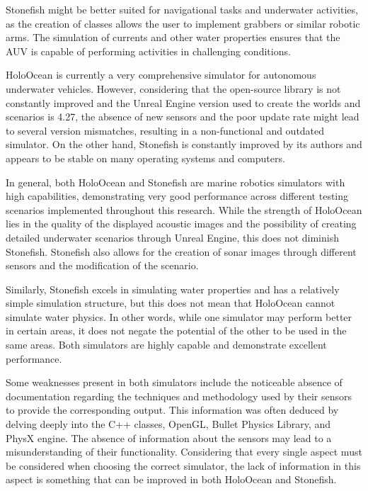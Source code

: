 \documentclass[]{article}
\begin{document}
	Stonefish might be better suited for navigational tasks and underwater activities, as the creation of classes allows the user to implement grabbers or similar robotic arms. The simulation of currents and other water properties ensures that the AUV is capable of performing activities in challenging conditions.
	
	HoloOcean is currently a very comprehensive simulator for autonomous underwater vehicles. However, considering that the open-source library is not constantly improved and the Unreal Engine version used to create the worlds and scenarios is 4.27, the absence of new sensors and the poor update rate might lead to several version mismatches, resulting in a non-functional and outdated simulator. On the other hand, Stonefish is constantly improved by its authors and appears to be stable on many operating systems and computers.
	
	In general, both HoloOcean and Stonefish are marine robotics simulators with high capabilities, demonstrating very good performance across different testing scenarios implemented throughout this research. While the strength of HoloOcean lies in the quality of the displayed acoustic images and the possibility of creating detailed underwater scenarios through Unreal Engine, this does not diminish Stonefish. Stonefish also allows for the creation of sonar images through different sensors and the modification of the scenario.
	
	Similarly, Stonefish excels in simulating water properties and has a relatively simple simulation structure, but this does not mean that HoloOcean cannot simulate water physics. In other words, while one simulator may perform better in certain areas, it does not negate the potential of the other to be used in the same areas. Both simulators are highly capable and demonstrate excellent performance.
	
	Some weaknesses present in both simulators include the noticeable absence of documentation regarding the techniques and methodology used by their sensors to provide the corresponding output. This information was often deduced by delving deeply into the C++ classes, OpenGL, Bullet Physics Library, and PhysX engine. The absence of information about the sensors may lead to a misunderstanding of their functionality. Considering that every single aspect must be considered when choosing the correct simulator, the lack of information in this aspect is something that can be improved in both HoloOcean and Stonefish.
	
	
	\newpage
	
\end{document}
